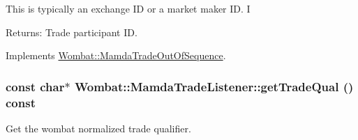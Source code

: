 This is typically an exchange ID or a market maker ID. I

\begin{Desc}
\item[Returns:]Trade participant ID. \end{Desc}


Implements \hyperlink{classWombat_1_1MamdaTradeOutOfSequence_96b795f0456fc3b4f706b6688898e27f}{Wombat::Mamda\-Trade\-Out\-Of\-Sequence}.\hypertarget{classWombat_1_1MamdaTradeListener_0f03f8d8b20f08eab587e439a939d0fc}{
\subsubsection[getTradeQual]{\setlength{\rightskip}{0pt plus 5cm}const char$\ast$ Wombat::Mamda\-Trade\-Listener::get\-Trade\-Qual () const}}
\label{classWombat_1_1MamdaTradeListener_0f03f8d8b20f08eab587e439a939d0fc}


Get the wombat normalized trade qualifier. 

